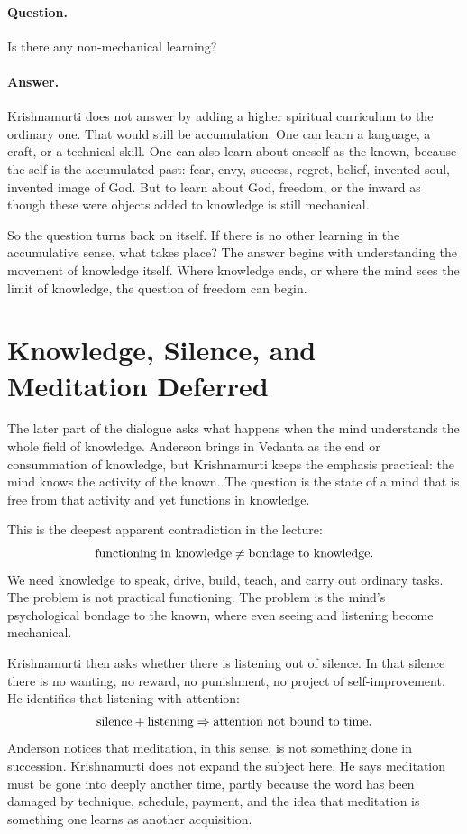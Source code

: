 \paragraph{Question.}
Is there any non-mechanical learning?

\paragraph{Answer.}
Krishnamurti does not answer by adding a higher spiritual curriculum to the ordinary one. That would still be accumulation. One can learn a language, a craft, or a technical skill. One can also learn about oneself as the known, because the self is the accumulated past: fear, envy, success, regret, belief, invented soul, invented image of God. But to learn about God, freedom, or the inward as though these were objects added to knowledge is still mechanical.

So the question turns back on itself. If there is no other learning in the accumulative sense, what takes place? The answer begins with understanding the movement of knowledge itself. Where knowledge ends, or where the mind sees the limit of knowledge, the question of freedom can begin.

\section{Knowledge, Silence, and Meditation Deferred}

The later part of the dialogue asks what happens when the mind understands the whole field of knowledge. Anderson brings in Vedanta as the end or consummation of knowledge, but Krishnamurti keeps the emphasis practical: the mind knows the activity of the known. The question is the state of a mind that is free from that activity and yet functions in knowledge.

This is the deepest apparent contradiction in the lecture:
\begin{equation}
\hbox{functioning in knowledge}
\neq
\hbox{bondage to knowledge}.
\end{equation}
We need knowledge to speak, drive, build, teach, and carry out ordinary tasks. The problem is not practical functioning. The problem is the mind's psychological bondage to the known, where even seeing and listening become mechanical.

Krishnamurti then asks whether there is listening out of silence. In that silence there is no wanting, no reward, no punishment, no project of self-improvement. He identifies that listening with attention:
\begin{equation}
\hbox{silence}+\hbox{listening}
\Rightarrow
\hbox{attention not bound to time}.
\end{equation}
Anderson notices that meditation, in this sense, is not something done in succession. Krishnamurti does not expand the subject here. He says meditation must be gone into deeply another time, partly because the word has been damaged by technique, schedule, payment, and the idea that meditation is something one learns as another acquisition.

